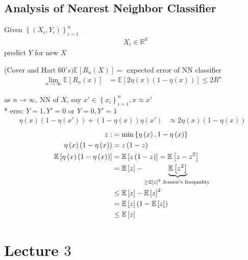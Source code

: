 \documentclass{article}
\begin{document}
\subsection{Analysis of Nearest Neighbor Classifier}
Given $\left\{\left(X_{i}, Y_{i}\right)\right\}_{i=1}^{n}$
\begin{align*}
&X_{i} \in \mathbb{R}^{d}
\end{align*}
predict $Y $ for new $X $

\begin{thm} \label{thm:ch} 
(Cover and Hart $60's) \mathbb{E}\left[R_{n} \left(X\right)\right] =$ expected error of NN classifier
\begin{align*}
\lim_{n\to \infty} \mathbb{E}\left[R_{n}\left(x\right)\right] &= \mathbb{E}\left[2 \eta\left(x\right) \left(1 - \eta\left(x\right)\right)\right] \leq  2 R^\star 
\end{align*}\end{thm}
as $n \to  \infty$, NN of $X $, say $x' \in \left\{x_{i}\right\}_{i=1}^{n}, x \approx x'$
\\* errs: $Y = 1, Y' = 0$ or $Y = 0, Y' = 1$
\begin{align*}
\eta\left(x\right)\left(1 - \eta\left(x'\right)\right) + \left(1 - \eta\left(x\right)\right) \eta\left(x'\right) &\approx 2 \eta\left(x\right) \left(1 - \eta\left(x\right)\right)
\end{align*}
\begin{align*}
z  :&= \displaystyle\min\left\{\eta\left(x\right), 1 - \eta\left(x\right)\right\}
\\ \eta\left(x\right)\left(1 - \eta\left(x\right)\right) &= z \left(1 - z\right)
\\ \mathbb{E}\left[\eta\left(x\right)\left(1 - \eta\left(x\right)\right)\right] &= \mathbb{E}\left[z \left(1 - z\right)\right] = \mathbb{E}\left[z - z^{2}\right]
\\ &= \mathbb{E}\left[z\right] - \underbrace{\mathbb{E}\left[z^{2}\right]}_{\geq  \mathbb{E}\left[z\right]^{2} \text{\;Jensen's Inequality\;}}
\\ &\leq  \mathbb{E}\left[z\right] - \mathbb{E}\left[z\right]^{2}
\\ &= \mathbb{E}\left[z\right] \left(1 - \mathbb{E}\left[z\right]\right)
\\ &\leq  \mathbb{E}\left[z\right]
\end{align*}





\section{Lecture $3$} 
\end{document}
